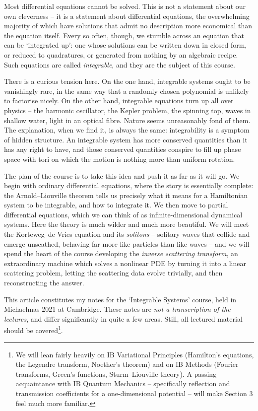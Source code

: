 



Most differential equations cannot be solved. This is not a statement about our own cleverness -- it is a statement about differential equations, the overwhelming majority of which have solutions that admit no description more economical than the equation itself. Every so often, though, we stumble across an equation that can be `integrated up': one whose solutions can be written down in closed form, or reduced to quadratures, or generated from nothing by an algebraic recipe. Such equations are called \emph{integrable}, and they are the subject of this course.

There is a curious tension here. On the one hand, integrable systems ought to be vanishingly rare, in the same way that a randomly chosen polynomial is unlikely to factorise nicely. On the other hand, integrable equations turn up all over physics -- the harmonic oscillator, the Kepler problem, the spinning top, waves in shallow water, light in an optical fibre. Nature seems unreasonably fond of them. The explanation, when we find it, is always the same: integrability is a symptom of hidden structure. An integrable system has more conserved quantities than it has any right to have, and those conserved quantities conspire to fill up phase space with tori on which the motion is nothing more than uniform rotation.

The plan of the course is to take this idea and push it as far as it will go. We begin with ordinary differential equations, where the story is essentially complete: the Arnold--Liouville theorem tells us precisely what it means for a Hamiltonian system to be integrable, and how to integrate it. We then move to partial differential equations, which we can think of as infinite-dimensional dynamical systems. Here the theory is much wilder and much more beautiful. We will meet the Korteweg--de Vries equation and its \emph{solitons} -- solitary waves that collide and emerge unscathed, behaving far more like particles than like waves -- and we will spend the heart of the course developing the \emph{inverse scattering transform}, an extraordinary machine which solves a nonlinear PDE by turning it into a linear scattering problem, letting the scattering data evolve trivially, and then reconstructing the answer.

This article constitutes my notes for the `Integrable Systems' course, held in Michaelmas 2021 at Cambridge. These notes are \emph{not a transcription of the lectures}, and differ significantly in quite a few areas. Still, all lectured material should be covered\footnote{We will lean fairly heavily on IB Variational Principles (Hamilton's equations, the Legendre transform, Noether's theorem) and on IB Methods (Fourier transforms, Green's functions, Sturm--Liouville theory). A passing acquaintance with IB Quantum Mechanics -- specifically reflection and transmission coefficients for a one-dimensional potential -- will make Section 3 feel much more familiar.}.



